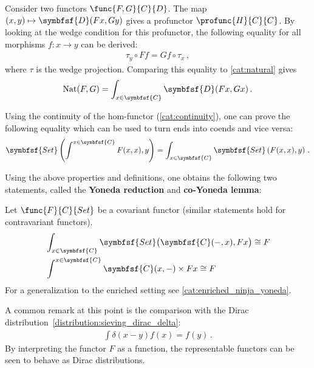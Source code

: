     \begin{example}
        Consider two functors $\func{F,G}{C}{D}$. The map $(x,y)\mapsto\symbfsf{D}(Fx,Gy)$ gives a profunctor $\profunc{H}{C}{C}$. By looking at the wedge condition for this profunctor, the following equality for all morphisms $f:x\rightarrow y$ can be derived:
        \begin{gather}
            \tau_y\circ Ff = Gf\circ\tau_x\,,
        \end{gather}
        where $\tau$ is the wedge projection. Comparing this equality to \cref{cat:natural} gives
        \begin{gather}
            \label{cat:natural_end}
            \mathrm{Nat}(F,G) = \int_{x\in\symbfsf{C}}\symbfsf{D}(Fx,Gx)\,.
        \end{gather}
    \end{example}

    \begin{property}
        Using the continuity of the hom-functor (\cref{cat:continuity}), one can prove the following equality which can be used to turn ends into coends and vice versa:
        \begin{gather}
            \symbfsf{Set}\left(\int^{x\in\symbfsf{C}}F(x,x),y\right) = \int_{x\in\symbfsf{C}}\symbfsf{Set}\left(F(x,x),y\right)\,.
        \end{gather}
    \end{property}

    Using the above properties and definitions, one obtains the following two statements, called the \textbf{Yoneda reduction} and \textbf{co-Yoneda lemma}:
    \begin{property}\label{cat:ninja_yoneda}
        Let $\func{F}{C}{Set}$ be a covariant functor (similar statements hold for contravariant functors).
        \begin{align}
            &\int_{x\in\symbfsf{C}}\symbfsf{Set}\bigl(\symbfsf{C}(-,x),Fx\bigr)\cong F\\
            &\int^{x\in\symbfsf{C}}\symbfsf{C}(x,-)\times Fx\cong F
        \end{align}
        For a generalization to the enriched setting see \cref{cat:enriched_ninja_yoneda}.
    \end{property}
    \begin{remark}
        A common remark at this point is the comparison with the Dirac distribution~\eqref{distribution:sieving_dirac_delta}:
        \begin{gather}
            \int \delta(x-y)f(x) = f(y)\,.
        \end{gather}
        By interpreting the functor $F$ as a function, the representable functors can be seen to behave as Dirac distributions.
    \end{remark}

